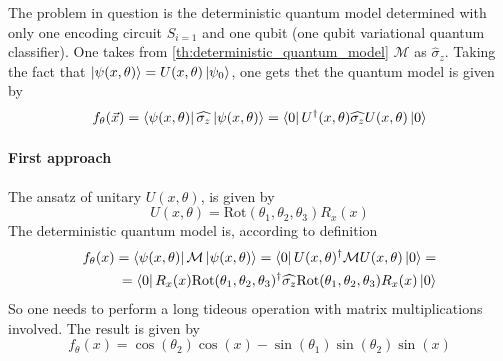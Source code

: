 The problem in question is the deterministic quantum model determined with only one encoding circuit $S_{i=1}$ 
and one qubit (one qubit variational quantum classifier).
One takes from \autoref{th:deterministic_quantum_model} $\mathcal{M}$ as $\widehat{\sigma}_z$. Taking the fact that 
$\ket{\psi(x, \theta)} = U(x, \theta)\ket{\psi_0}$, one gets thet the quantum model is given by 
\begin{equation}
  f_\theta(\vec{x}) = \bra{\psi(x,\theta)} \widehat{\sigma_z} \ket{\psi(x,\theta)} = 
  \bra{0}U^{\dag}(x,\theta)\widehat{\sigma_z}U(x,\theta)\ket{0}
\end{equation}

\paragraph{First approach} 
The ansatz of unitary $U(x,\theta)$, is given by 
\begin{equation*}
  U(x, \theta) = \text{Rot}(\theta_1, \theta_2, \theta_3)R_x(x)
\end{equation*}
The deterministic quantum model is, according to definition 
  \begin{align}
  f_\theta(x) = \bra{\psi(x, \theta)}\mathcal{M}\ket{\psi(x, \theta)} = \bra{0}U(x,\theta)^\dag \mathcal{M} U(x,\theta)\ket{0} = \\
  = \bra{0} R_x(x) \text{Rot}(\theta_1, \theta_2, \theta_3)^\dag \widehat{\sigma_z} \text{Rot}(\theta_1, \theta_2, \theta_3)R_x(x) 
  \ket{0} 
  \end{align}
  So one needs to perform a long tideous operation with matrix multiplications involved. The result is given by 
  \begin{equation}
    f_\theta(x) = \cos(\theta_2)\cos(x) - \sin(\theta_1)\sin(\theta_2)\sin(x)
  \end{equation}

